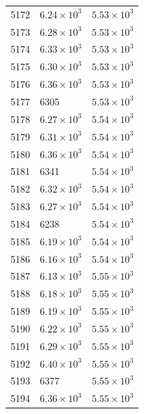 \begin{table}[H]
\begin{tabular}{lll}
5172 & $\displaystyle 6.24 \times 10^{3}$ & $\displaystyle 5.53 \times 10^{3}$ \\
5173 & $\displaystyle 6.28 \times 10^{3}$ & $\displaystyle 5.53 \times 10^{3}$ \\
5174 & $\displaystyle 6.33 \times 10^{3}$ & $\displaystyle 5.53 \times 10^{3}$ \\
5175 & $\displaystyle 6.30 \times 10^{3}$ & $\displaystyle 5.53 \times 10^{3}$ \\
5176 & $\displaystyle 6.36 \times 10^{3}$ & $\displaystyle 5.53 \times 10^{3}$ \\
5177 & 6305 & $\displaystyle 5.53 \times 10^{3}$ \\
5178 & $\displaystyle 6.27 \times 10^{3}$ & $\displaystyle 5.54 \times 10^{3}$ \\
5179 & $\displaystyle 6.31 \times 10^{3}$ & $\displaystyle 5.54 \times 10^{3}$ \\
5180 & $\displaystyle 6.36 \times 10^{3}$ & $\displaystyle 5.54 \times 10^{3}$ \\
5181 & 6341 & $\displaystyle 5.54 \times 10^{3}$ \\
5182 & $\displaystyle 6.32 \times 10^{3}$ & $\displaystyle 5.54 \times 10^{3}$ \\
5183 & $\displaystyle 6.27 \times 10^{3}$ & $\displaystyle 5.54 \times 10^{3}$ \\
5184 & 6238 & $\displaystyle 5.54 \times 10^{3}$ \\
5185 & $\displaystyle 6.19 \times 10^{3}$ & $\displaystyle 5.54 \times 10^{3}$ \\
5186 & $\displaystyle 6.16 \times 10^{3}$ & $\displaystyle 5.54 \times 10^{3}$ \\
5187 & $\displaystyle 6.13 \times 10^{3}$ & $\displaystyle 5.55 \times 10^{3}$ \\
5188 & $\displaystyle 6.18 \times 10^{3}$ & $\displaystyle 5.55 \times 10^{3}$ \\
5189 & $\displaystyle 6.19 \times 10^{3}$ & $\displaystyle 5.55 \times 10^{3}$ \\
5190 & $\displaystyle 6.22 \times 10^{3}$ & $\displaystyle 5.55 \times 10^{3}$ \\
5191 & $\displaystyle 6.29 \times 10^{3}$ & $\displaystyle 5.55 \times 10^{3}$ \\
5192 & $\displaystyle 6.40 \times 10^{3}$ & $\displaystyle 5.55 \times 10^{3}$ \\
5193 & 6377 & $\displaystyle 5.55 \times 10^{3}$ \\
5194 & $\displaystyle 6.36 \times 10^{3}$ & $\displaystyle 5.55 \times 10^{3}$ \\

\end{tabular}
\end{table}
